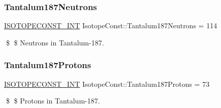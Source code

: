 \subsubsection{\texorpdfstring{Tantalum187\+Neutrons}{Tantalum187Neutrons}}
{\footnotesize\ttfamily \mbox{\hyperlink{group___isotope_const-_macros_ga5f18360b3e99483a35c32d789e62621c}{I\+S\+O\+T\+O\+P\+E\+C\+O\+N\+S\+T\+\_\+\+I\+NT}} Isotope\+Const\+::\+Tantalum187\+Neutrons = 114}

\$ \$ Neutrons in Tantalum-\/187. \mbox{\label{group___isotope_const-_tantalum-_ta187_ga09fdb03e29f194faecfbab89c93b6d3f}} 
\subsubsection{\texorpdfstring{Tantalum187\+Protons}{Tantalum187Protons}}
{\footnotesize\ttfamily \mbox{\hyperlink{group___isotope_const-_macros_ga5f18360b3e99483a35c32d789e62621c}{I\+S\+O\+T\+O\+P\+E\+C\+O\+N\+S\+T\+\_\+\+I\+NT}} Isotope\+Const\+::\+Tantalum187\+Protons = 73}

\$ \$ Protons in Tantalum-\/187. 